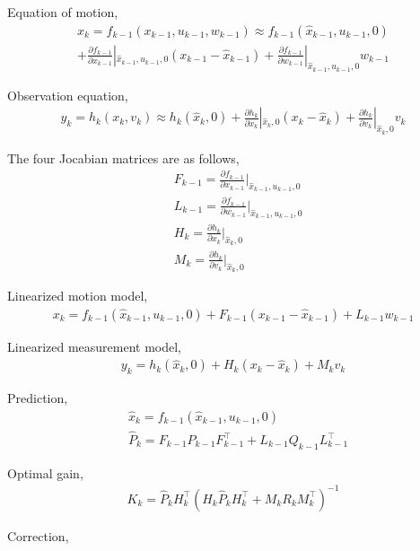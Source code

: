 \documentclass[a4paper,11pt,reqno]{amsart}
\newcommand{\tran}{\intercal}
\begin{document}
Equation of motion,
$$
\begin{aligned}
    x_k=f_{k-1}(x_{k-1},u_{k-1},w_{k-1}) \approx f_{k-1}(\hat{x}_{k-1},u_{k-1},0)
    \\
    +\frac{\partial f_{k-1}}{\partial x_{k-1}}|_{\hat{x}_{k-1},u_{k-1},0}(x_{k-1}-\hat{x}_{k-1})
    +\frac{\partial f_{k-1}}{\partial w_{k-1}}|_{\hat{x}_{k-1},u_{k-1},0}w_{k-1}
\end{aligned}
$$

Observation equation,
$$
\begin{aligned}
    y_k=h_k(x_k,v_k) \approx h_k(\hat{x}_k,0)+\frac{\partial h_{k}}{\partial x_{k}}|_{\hat{x}_k,0}
    (x_k-\hat{x}_k)+\frac{\partial h_{k}}{\partial v_{k}}|_{\hat{x}_k,0}v_k
\end{aligned}
$$

The four Jocabian matrices are as follows,
$$
\begin{aligned}
    &F_{k-1}=\frac{\partial f_{k-1}}{\partial x_{k-1}}|_{\hat{x}_{k-1},u_{k-1},0}
    \\
    &L_{k-1}=\frac{\partial f_{k-1}}{\partial w_{k-1}}|_{\hat{x}_{k-1},u_{k-1},0}
    \\
    &H_k=\frac{\partial h_{k}}{\partial x_{k}}|_{\hat{x}_k,0}
    \\
    &M_k=\frac{\partial h_{k}}{\partial v_{k}}|_{\hat{x}_k,0}
\end{aligned}
$$

Linearized motion model,
$$
\begin{aligned}
    x_k=f_{k-1}(\hat{x}_{k-1},u_{k-1},0)+F_{k-1}(x_{k-1}-\hat{x}_{k-1})+L_{k-1}w_{k-1}
\end{aligned}
$$

Linearized measurement model,
$$
\begin{aligned}
    y_k=h_k(\hat{x}_k,0)+H_k(x_k-\hat{x}_k)+M_kv_k
\end{aligned}
$$

Prediction,
$$
\begin{aligned}
    &\hat{x}_k=f_{k-1}(\hat{x}_{k-1},u_{k-1},0)
    \\
    &\hat{P}_k=F_{k-1}\hat{P}_{k-1}F^{\tran}_{k-1}+L_{k-1}Q_{k-1}L^{\tran}_{k-1}
\end{aligned}
$$

Optimal gain,
$$
\begin{aligned}
    K_k=\hat{P}_kH^{\tran}_{k}(H_k\hat{P}_kH^{\tran}_{k}+M_kR_kM^{\tran}_{k})^{-1}
\end{aligned}
$$

Correction,
\end{document}
